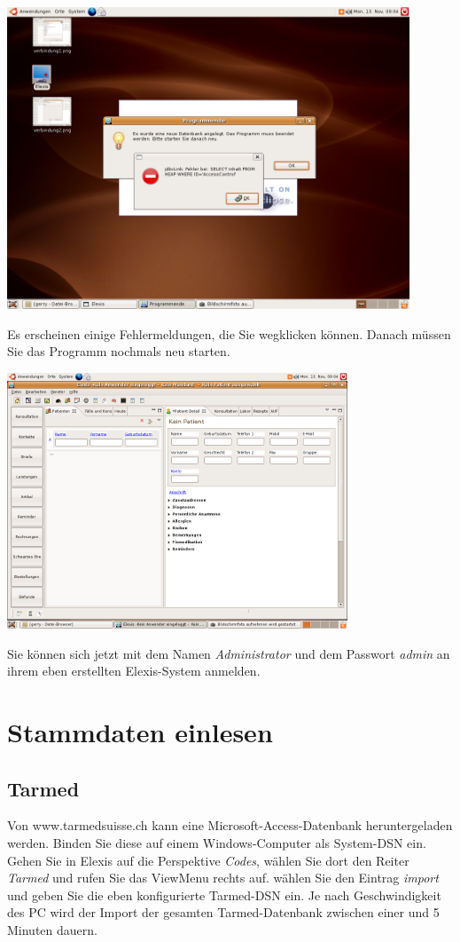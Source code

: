 \includegraphics[width=0.9\textwidth]{images/verbindung13.png}

 Es erscheinen einige Fehlermeldungen, die Sie wegklicken können. Danach müssen Sie das Programm nochmals neu starten.

\includegraphics[width=4in]{images/verbindung14.png}

Sie können sich jetzt mit dem Namen \textit{Administrator} und dem Passwort \textit{admin} an ihrem eben erstellten Elexis-System anmelden.

\section{Stammdaten einlesen}
\subsection{Tarmed}
Von www.tarmedsuisse.ch kann eine Microsoft-Access-Datenbank heruntergeladen werden. Binden Sie diese auf einem Windows-Computer als System-DSN ein. Gehen Sie in Elexis auf die Perspektive \textit{Codes}, wählen Sie dort den Reiter \textit{Tarmed} und rufen Sie das ViewMenu rechts auf. wählen Sie den Eintrag \textit{import} und geben Sie die eben konfigurierte Tarmed-DSN ein. Je nach Geschwindigkeit des PC wird der Import der gesamten Tarmed-Datenbank zwischen einer und 5 Minuten dauern. 
